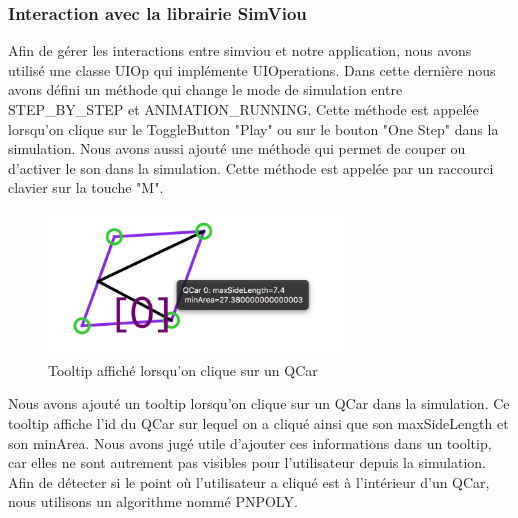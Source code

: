 \documentclass[a4paper, 12pt]{article}
\begin{document}
\subsubsection{Interaction avec la librairie SimViou}
Afin de gérer les interactions entre simviou et notre application, nous avons utilisé une classe UIOp qui implémente UIOperations. Dans cette dernière nous avons défini un méthode qui change le mode de simulation entre STEP\_BY\_STEP et ANIMATION\_RUNNING. Cette méthode est appelée lorsqu'on clique sur le ToggleButton "Play" ou sur le bouton "One Step" dans la simulation. Nous avons aussi ajouté une méthode qui permet de couper ou d'activer le son dans la simulation. Cette méthode est appelée par un raccourci clavier sur la touche "M".
\begin{figure}[H]
 \centering
 \includegraphics[width=0.7\textwidth]{includes/images/tooltip}
 \caption{\label{fig:tooltip}Tooltip affiché lorsqu'on clique sur un QCar}
\end{figure}
Nous avons ajouté un tooltip lorsqu'on clique sur un QCar dans la simulation. Ce tooltip affiche l'id du QCar sur lequel on a cliqué ainsi que son maxSideLength et son minArea. Nous avons jugé utile d'ajouter ces informations dans un tooltip, car elles ne sont autrement pas visibles pour l'utilisateur depuis la simulation. Afin de détecter si le point où l'utilisateur a cliqué est à l'intérieur d'un QCar, nous utilisons un algorithme nommé PNPOLY.
\end{document}
